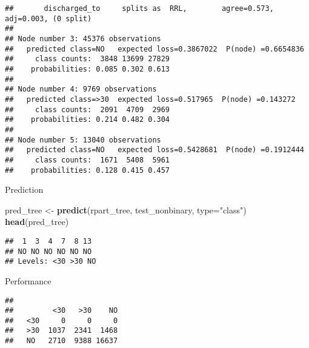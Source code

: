 \documentclass[]{article}
\newenvironment{Shaded}{\begin{snugshade}}{\end{snugshade}}
\newcommand{\KeywordTok}[1]{\textcolor[rgb]{0.13,0.29,0.53}{\textbf{#1}}}
\newcommand{\DataTypeTok}[1]{\textcolor[rgb]{0.13,0.29,0.53}{#1}}
\newcommand{\StringTok}[1]{\textcolor[rgb]{0.31,0.60,0.02}{#1}}
\newcommand{\OperatorTok}[1]{\textcolor[rgb]{0.81,0.36,0.00}{\textbf{#1}}}
\newcommand{\NormalTok}[1]{#1}
\begin{document}
\begin{verbatim}
##       discharged_to     splits as  RRL,        agree=0.573, adj=0.003, (0 split)
## 
## Node number 3: 45376 observations
##   predicted class=NO   expected loss=0.3867022  P(node) =0.6654836
##     class counts:  3848 13699 27829
##    probabilities: 0.085 0.302 0.613 
## 
## Node number 4: 9769 observations
##   predicted class=>30  expected loss=0.517965  P(node) =0.143272
##     class counts:  2091  4709  2969
##    probabilities: 0.214 0.482 0.304 
## 
## Node number 5: 13040 observations
##   predicted class=NO   expected loss=0.5428681  P(node) =0.1912444
##     class counts:  1671  5408  5961
##    probabilities: 0.128 0.415 0.457
\end{verbatim}

Prediction

\begin{Shaded}
\begin{Highlighting}[]
\NormalTok{pred_tree <-}\StringTok{ }\KeywordTok{predict}\NormalTok{(rpart_tree, test_nonbinary, }\DataTypeTok{type=}\StringTok{"class"}\NormalTok{)}
\KeywordTok{head}\NormalTok{(pred_tree)}
\end{Highlighting}
\end{Shaded}

\begin{verbatim}
##  1  3  4  7  8 13 
## NO NO NO NO NO NO 
## Levels: <30 >30 NO
\end{verbatim}

Performance

\begin{Shaded}
\end{Shaded}

\begin{verbatim}
##      
##         <30   >30    NO
##   <30     0     0     0
##   >30  1037  2341  1468
##   NO   2710  9388 16637
\end{verbatim}

\begin{Shaded}
\end{Shaded}
\end{document}
